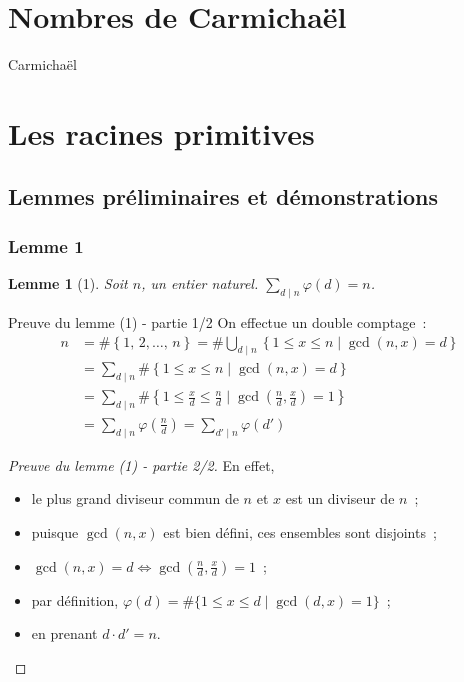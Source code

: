 \documentclass[10pt, mathserif]{beamer}
\newtheorem{lem}[thm]{Lemme}
\theoremstyle{definition}
\theoremstyle{remark}
\begin{document}
\section{Nombres de Carmichaël}
	\begin{frame}
		Carmichaël
	\end{frame}

\section{Les racines primitives}
	\subsection{Lemmes préliminaires et démonstrations}
	\begin{frame}
		\frametitle{Lemme 1}
		\begin{lem}[1]
			Soit $n$, un entier naturel. %
			$\sum_{d \mid n} \varphi(d) = n$.
		\end{lem}

		\begin{block}{Preuve du lemme (1) - partie 1/2}
			On effectue un double comptage~:
			\[\begin{aligned}
			n &= \#\left\{1,\,2,\ldots,\,n\right\} = \#\bigcup_{d\mid n}\left\{1\le x\le n \mid \gcd(n,x)=d\right\} \\
			  &= \sum_{d\mid n}\#\left\{1\le x\le n\mid \gcd(n,x)=d\right\} \\
			  &= \sum_{d\mid n}\#\left\{1\le \frac{x}{d}\le \frac{n}{d}\mid \gcd\left(\frac{n}{d},\frac{x}{d}\right)=1 \right\} \\
			  &= \sum_{d\mid n}\varphi\left(\frac{n}{d}\right) = \sum_{d'\mid n}\varphi(d')
			\end{aligned}\]
		\end{block}
	\end{frame}

	\begin{frame}
		\begin{proof}[Preuve du lemme (1) - partie 2/2]
			En effet,
			\begin{itemize}
				\item le plus grand diviseur commun de $n$ et $x$ est un diviseur de $n$~;
				\item puisque $\gcd(n,x)$ est bien défini, ces ensembles sont disjoints~;
				\item $\gcd(n,x)=d\Longleftrightarrow \gcd\left(\frac{n}{d},\frac{x}{d}\right)=1$~;
				\item par définition, $\varphi(d)=\#\{1\le x\le d\mid \gcd(d,x)=1\}$~;
				\item en prenant $d\cdot d'=n$.
			\end{itemize}
		\end{proof}
	\end{frame}
\end{document}
